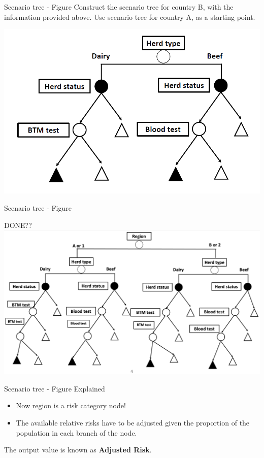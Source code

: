 \documentclass[
  ignorenonframetext,
]{beamer}
\begin{document}
\begin{frame}{Scenario tree - Figure}
\protect\hypertarget{scenario-tree---figure}{}
Construct the scenario tree for country B, with the information provided
above. Use scenario tree for country A, as a starting point.

\includegraphics{figs/simple_scenario_tree.png}
\end{frame}

\begin{frame}{Scenario tree - Figure}
\protect\hypertarget{scenario-tree---figure-1}{}
\begin{block}{DONE??}
\protect\hypertarget{done}{}
\includegraphics{figs/second_example_scenario_tree.png}
\end{block}
\end{frame}

\begin{frame}{Scenario tree - Figure Explained}
\protect\hypertarget{scenario-tree---figure-explained}{}
\begin{itemize}
\item
  Now region is a risk category node!
\item
  The available relative risks have to be adjusted given the proportion
  of the population in each branch of the node.
\end{itemize}

The output value is known as \textbf{Adjusted Risk}.
\end{frame}
\end{document}
